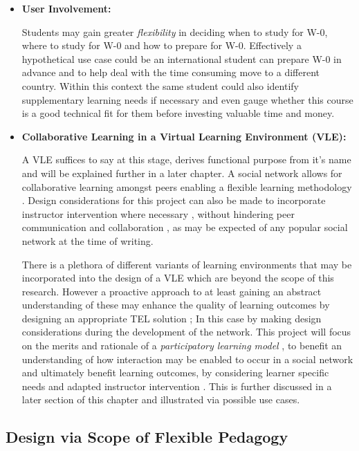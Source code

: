 \begin{itemize}
    \item \textbf{User Involvement:}
    
    Students may gain greater \textit{flexibility} in deciding when to study for W-0, where to study for W-0 and how to prepare for W-0. Effectively a hypothetical use case could be an international student can prepare W-0 in advance and to help deal with the time consuming move to a different country. Within this context the same student could also identify supplementary learning needs if necessary and even gauge whether this course is a good technical fit for them before investing valuable time and money.
       
    \item \textbf{Collaborative Learning in a Virtual Learning Environment (VLE):}
    
    A VLE suffices to say at this stage, derives functional purpose from it's name and will be explained further in a later chapter. A social network allows for collaborative learning amongst peers enabling a flexible learning methodology \cite{Cubukcuo2012}. Design considerations for this project can also be made to incorporate instructor intervention where necessary \cite{Cubukcuo2012,Burge2011}, without hindering peer  communication and collaboration \cite{Cubukcuo2012}, as may be expected of any popular social network at the time of writing.
    
    There is a plethora of different variants of learning environments that may be incorporated into the design of a VLE \cite{Richmond2005,Cubukcuo2012,Burge2011} which are beyond the scope of this research. However a proactive approach to at least gaining an abstract understanding of these may enhance the quality of learning outcomes by designing an appropriate TEL solution \cite{Cubukcuo2012}; In this case by making design considerations during the development of the network. This project will focus on the merits and rationale of a \textit{participatory learning model} \cite{Yager1990,Yager2004}, to benefit an understanding of how interaction may be enabled to occur in a social network and ultimately benefit learning outcomes, by considering learner specific needs and adapted instructor intervention \cite{Cubukcuo2012}. This is further discussed in a later section of this chapter and illustrated via possible use cases.
    
\end{itemize}

\label{sec:sec01}
\subsection{Design via Scope of Flexible Pedagogy}
\label{subsec:subsec01}

